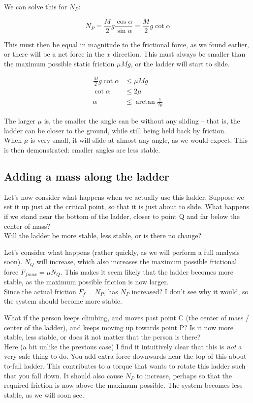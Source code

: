 We can solve this for $N_P$:

\begin{equation}
N_P = \frac{M}{2} g \frac{\cos \alpha}{\sin \alpha} = \frac{M}{2} g \cot \alpha
\end{equation}

This must then be equal in magnitude to the frictional force, as we found earlier, or there will be a net force in the $x$ direction. This must always be smaller than the maximum possible static friction $\mu M g$, or the ladder will start to slide.

\begin{align}
\frac{M}{2} g \cot \alpha &\le \mu M g\\
\cot \alpha &\le 2 \mu\\
\alpha &\le \arctan \frac{1}{2 \mu}
\end{align}

The larger $\mu$ is, the smaller the angle can be without any sliding -- that is, the ladder can be closer to the ground, while still being held back by friction.\\
When $\mu$ is very small, it will slide at almost any angle, as we would expect. This is then demonstrated: smaller angles are less stable.

\subsection{Adding a mass along the ladder}

Let's now consider what happens when we actually use this ladder. Suppose we set it up just at the critical point, so that it is just about to slide. What happens if we stand near the bottom of the ladder, closer to point Q and far below the center of mass?\\
Will the ladder be more stable, less stable, or is there no change?

Let's consider what happens (rather quickly, as we will perform a full analysis soon). $N_Q$ will increase, which also increases the maximum possible frictional force $F_{fmax} = \mu N_Q$. This makes it seem likely that the ladder becomes more stable, as the maximum possible friction is now larger.\\
Since the actual friction $F_f = N_P$, has $N_P$ increased? I don't see why it would, so the system should become more stable.

What if the person keeps climbing, and moves past point C (the center of mass / center of the ladder), and keeps moving up towards point P? Is it now more stable, less stable, or does it not matter that the person is there?\\
Here (a bit unlike the previous case) I find it intuitively clear that this is \emph{not} a very safe thing to do. You add extra force downwards near the top of this about-to-fall ladder. This contributes to a torque that wants to rotate this ladder such that you fall down. It should also cause $N_P$ to increase, perhaps so that the required friction is now above the maximum possible. The system becomes less stable, as we will soon see.

